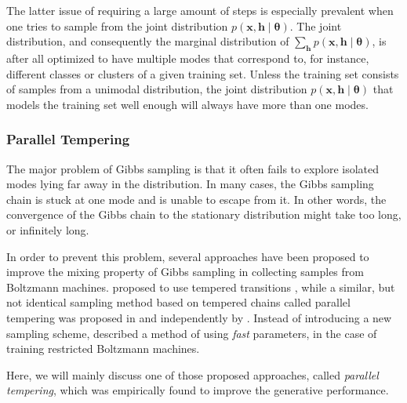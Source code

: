 \documentclass[dissertation,nocontribution]{aaltoseries}
\newcommand{\vect}[1]{\mathbf{#1}}
\newcommand{\vects}[1]{\boldsymbol{#1}}
\newcommand{\vh}[0]{\vect{h}}
\newcommand{\vx}[0]{\vect{x}}
\newcommand{\TT}[0]{{\vects{\theta}}}
\begin{document}
The latter issue of requiring a large amount of steps is
especially prevalent when one tries to sample from the joint
distribution $p(\vx, \vh \mid \TT)$.  The joint distribution, and
consequently the marginal distribution of $\sum_{\vh} p(\vx, \vh
        \mid \TT)$, is after all optimized to have multiple modes
that correspond to, for instance, different classes or clusters
of a given training set. Unless the training set consists of
samples from a unimodal distribution, the joint distribution
$p(\vx, \vh \mid \TT)$ that models the training set well enough
will always have more than one modes.


\subsubsection{Parallel Tempering}
\label{sec:parallel_tempering}


The major problem of Gibbs sampling is that it often
fails to explore isolated modes lying far away in the
distribution.  In many cases, the Gibbs sampling chain is
stuck at one mode and is unable to escape from it. In other
words, the convergence of the Gibbs chain to the stationary
distribution might take too long, or infinitely long.

In order to prevent this problem, several approaches have
been proposed to improve the mixing property of Gibbs
sampling in collecting samples from Boltzmann machines.
\citet{Salakhutdinov2009} proposed to use tempered
transitions \citep{Neal1994}, while a similar, but not
identical sampling method based on tempered chains called
parallel tempering was proposed in
 and independently by
\citet{Desjardins2010,Desjardins2010a}.  Instead of
introducing a new sampling scheme, \citet{Tieleman2009}
described a method of using \textit{fast} parameters,
in the case of training restricted Boltzmann
machines.

Here, we will mainly discuss one of those proposed
approaches, called \textit{parallel tempering}, which was
empirically found to improve the generative performance.
\end{document}
